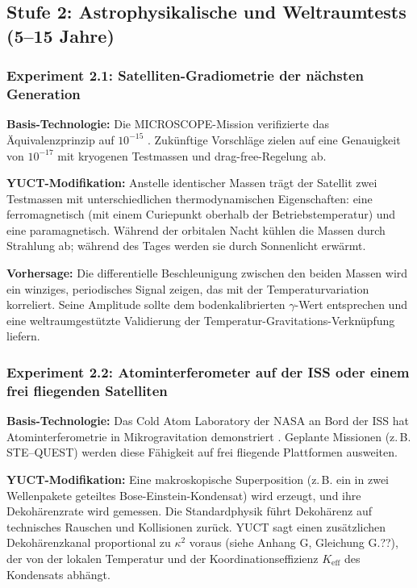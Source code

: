 \documentclass[12pt]{article}
\theoremstyle{remark}
\newcommand{\Keff}{K_{\mathrm{eff}}}
\begin{document}
	\subsection{Stufe 2: Astrophysikalische und Weltraumtests (5–15 Jahre)}
	\label{subsec:space-tests}
	
	\subsubsection{Experiment 2.1: Satelliten-Gradiometrie der nächsten Generation}
	
	\textbf{Basis-Technologie:} Die MICROSCOPE-Mission verifizierte das Äquivalenzprinzip auf \(10^{-15}\) \cite{Touboul2022}. Zukünftige Vorschläge zielen auf eine Genauigkeit von \(10^{-17}\) mit kryogenen Testmassen und drag-free-Regelung ab.
	
	\textbf{YUCT-Modifikation:} Anstelle identischer Massen trägt der Satellit zwei Testmassen mit unterschiedlichen thermodynamischen Eigenschaften: eine ferromagnetisch (mit einem Curiepunkt oberhalb der Betriebstemperatur) und eine paramagnetisch. Während der orbitalen Nacht kühlen die Massen durch Strahlung ab; während des Tages werden sie durch Sonnenlicht erwärmt.
	
	\textbf{Vorhersage:} Die differentielle Beschleunigung zwischen den beiden Massen wird ein winziges, periodisches Signal zeigen, das mit der Temperaturvariation korreliert. Seine Amplitude sollte dem bodenkalibrierten \(\gamma\)-Wert entsprechen und eine weltraumgestützte Validierung der Temperatur-Gravitations-Verknüpfung liefern.
	
	\subsubsection{Experiment 2.2: Atominterferometer auf der ISS oder einem frei fliegenden Satelliten}
	
	\textbf{Basis-Technologie:} Das Cold Atom Laboratory der NASA an Bord der ISS hat Atominterferometrie in Mikrogravitation demonstriert \cite{Aveline2020}. Geplante Missionen (z. B. STE–QUEST) werden diese Fähigkeit auf frei fliegende Plattformen ausweiten.
	
	\textbf{YUCT-Modifikation:} Eine makroskopische Superposition (z. B. ein in zwei Wellenpakete geteiltes Bose-Einstein-Kondensat) wird erzeugt, und ihre Dekohärenzrate wird gemessen. Die Standardphysik führt Dekohärenz auf technisches Rauschen und Kollisionen zurück. YUCT sagt einen zusätzlichen Dekohärenzkanal proportional zu \(\kappa^2\) voraus (siehe Anhang G, Gleichung G.??), der von der lokalen Temperatur und der Koordinationseffizienz \(\Keff\) des Kondensats abhängt.
	
\end{document}
